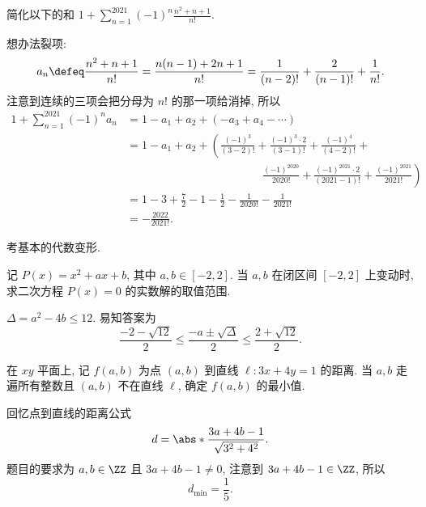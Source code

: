 \documentclass{article}
\begin{document}


\begin{prob}
简化以下的和 $1 + \sum_{n=1}^{2021}(-1)^n \frac{n^2 + n + 1}{n!}$.
\end{prob}

\begin{soln}
想办法裂项:
\begin{equation}
\label{eq1}
a_n \defeq \frac{n^2 + n + 1}{n!} = \frac{n(n-1) + 2n + 1}{n!} = \frac{1}{(n-2)!} + \frac{2}{(n-1)!} + \frac{1}{n!}.
\end{equation}
注意到连续的三项会把分母为 $n!$ 的那一项给消掉, 所以
\begin{align*}
1 + \sum_{n=1}^{2021}(-1)^na_n &= 1 - a_1 + a_2 + (-a_3 + a_4 - \cdots)\\
&=1 - a_1 + a_2 + \left(\frac{(-1)^3}{(3-2)!} + \frac{(-1)^3\cdot 2}{(3-1)!} + \frac{(-1)^4}{(4-2)!} +\right.\\
&\phantom{=========}\left.\frac{(-1)^{2020}}{2020!} + \frac{(-1)^{2021}\cdot 2}{(2021-1)!} + \frac{(-1)^{2021}}{2021!}\right)\\
&= 1 - 3 + \frac{7}{2} - 1 - \frac{1}{2} - \frac{1}{2020!} - \frac{1}{2021!}\\
&= \boxed{-\frac{2022}{2021!}.}
\end{align*}
\end{soln}

\begin{rem}
考基本的代数变形.
\end{rem}

\begin{prob}
记 $P(x) = x^2 + ax + b$, 其中 $a,b \in [-2,2]$.
当 $a,b$ 在闭区间 $[-2,2]$ 上变动时,
求二次方程 $P(x) = 0$ 的实数解的取值范围.
\end{prob}

\begin{soln}
$\Delta = a^2 - 4b \le 12$. 易知答案为
\[\boxed{\frac{-2 - \sqrt{12}}{2}} \le \frac{-a \pm \sqrt{\Delta}}{2} \le \boxed{\frac{2 + \sqrt{12}}{2}.}\]
\end{soln}

\begin{prob}
在 $xy$ 平面上, 记 $f(a,b)$ 为点 $(a,b)$ 到直线 $\ell: 3x + 4y = 1$ 的距离.
当 $a,b$ 走遍所有整数且 $(a,b)$ 不在直线 $\ell$, 确定 $f(a,b)$ 的最小值.
\end{prob}

\begin{soln}
回忆点到直线的距离公式
\begin{equation}
\label{eq2}
d = \abs*{\frac{3a + 4b - 1}{\sqrt{3^2 + 4^2}}}.
\end{equation}
题目的要求为 $a,b \in \ZZ$ 且 $3a + 4b - 1 \ne 0$,
注意到 $3a + 4b - 1 \in \ZZ$, 所以
\[d_{\mathrm{min}} = \boxed{\frac{1}{5}.}\]
\end{soln}
\end{document}
